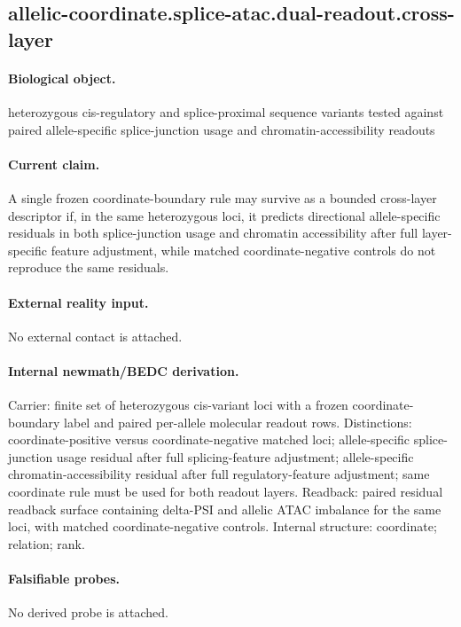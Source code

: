 \subsection{allelic-coordinate.splice-atac.dual-readout.cross-layer}

\paragraph{Biological object.} heterozygous cis-regulatory and splice-proximal sequence variants tested against paired allele-specific splice-junction usage and chromatin-accessibility readouts

\paragraph{Current claim.} A single frozen coordinate-boundary rule may survive as a bounded cross-layer descriptor if, in the same heterozygous loci, it predicts directional allele-specific residuals in both splice-junction usage and chromatin accessibility after full layer-specific feature adjustment, while matched coordinate-negative controls do not reproduce the same residuals.

\paragraph{External reality input.}
No external contact is attached.

\paragraph{Internal newmath/BEDC derivation.} Carrier: finite set of heterozygous cis-variant loci with a frozen coordinate-boundary label and paired per-allele molecular readout rows. Distinctions: coordinate-positive versus coordinate-negative matched loci; allele-specific splice-junction usage residual after full splicing-feature adjustment; allele-specific chromatin-accessibility residual after full regulatory-feature adjustment; same coordinate rule must be used for both readout layers. Readback: paired residual readback surface containing delta-PSI and allelic ATAC imbalance for the same loci, with matched coordinate-negative controls. Internal structure: coordinate; relation; rank.

\paragraph{Falsifiable probes.}
No derived probe is attached.

